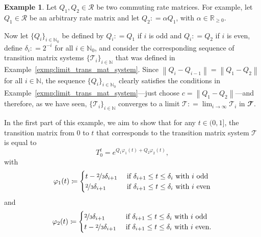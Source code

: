 \documentclass[10pt,a4paper]{paper}
\theoremstyle{definition}
\newtheorem{exmp}{Example}%
\newcommand{\nats}{\mathbb{N}}
\newcommand{\reals}{\mathbb{R}}
\newcommand{\realsnonneg}{\reals_{\geq 0}}
\newcommand{\norm}[1]{\left\lVert #1 \right\rVert}
\newcommand{\coloneqq}{:\!=}
\begin{document}
\begin{exmp}\label{exmp:limit_trans_mat_system_matrices}
Let $Q_1,Q_2\in\mathcal{R}$ be two commuting rate matrices. For example, let $Q_1\in\mathcal{R}$ be an arbitrary rate matrix and let $Q_2\coloneqq\alpha Q_1$, with $\alpha\in\realsnonneg$. 

Now let $\{Q_i\}_{i\in\nats_0}$ be defined by $Q_i\coloneqq Q_1$ if $i$ is odd and $Q_i\coloneqq Q_2$ if $i$ is even, define $\delta_i\coloneqq 2^{-i}$ for all $i\in\nats_0$, and consider the corresponding sequence of transition matrix systems $\{\mathcal{T}_i\}_{i\in\nats}$ that was defined in Example~\ref{exmp:limit_trans_mat_system}.  Since $\norm{Q_i-Q_{i-1}}=\norm{Q_1-Q_2}$ for all $i\in\nats$, the sequence $\{Q_i\}_{i\in\nats_0}$ clearly satisfies the conditions in Example~\ref{exmp:limit_trans_mat_system}---just choose $c=\norm{Q_1-Q_2}$---and therefore, as we have seen, $\{\mathcal{T}_i\}_{i\in\nats}$ converges to a limit $\mathcal{T}\coloneqq \lim_{i\to\infty}\mathcal{T}_i$ in $\mathbfcal{T}$. 


In the first part of this example, we aim to show that for any $t\in(0,1]$, the transition matrix from $0$ to $t$ that corresponds to the transition matrix system $\mathcal{T}$ is equal to
\vspace{4pt}
\begin{equation}\label{eq:ex4:def}
T_0^t=e^{Q_1\varphi_1(t)+Q_2\varphi_2(t)},
\end{equation}
with
\begin{equation}\label{eq:ex4:phi1}
\varphi_1(t)
\coloneqq
\begin{cases}
t-\nicefrac{2}{3}\delta_{i+1}
&\text{ if $\delta_{i+1}\leq t\leq\delta_{i}$ with $i$ odd}\\
\nicefrac{2}{3}\delta_{i+1}
&\text{ if $\delta_{i+1}\leq t\leq\delta_{i}$ with $i$ even} 
\end{cases}
\end{equation}
and
\begin{equation}\label{eq:ex4:phi2}
\varphi_2(t)
\coloneqq
\begin{cases}
\nicefrac{2}{3}\delta_{i+1}
&\text{ if $\delta_{i+1}\leq t\leq\delta_{i}$ with $i$ odd}\\
t-\nicefrac{2}{3}\delta_{i+1}
&\text{ if $\delta_{i+1}\leq t\leq\delta_{i}$ with $i$ even.} 
\end{cases}
\vspace{7pt}
\end{equation}


\end{exmp}
\end{document}

